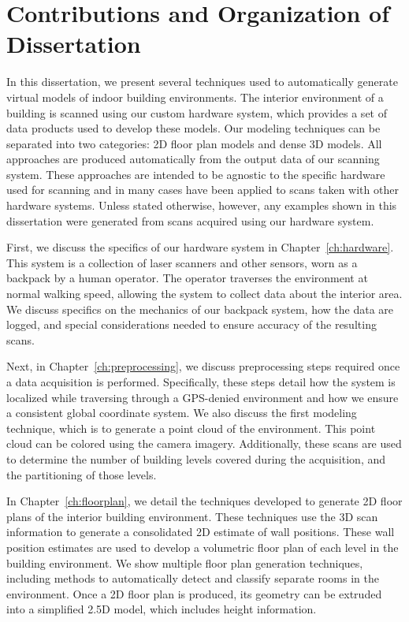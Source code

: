 \documentclass[12pt,onecolumn,oneside]{book}
\begin{document}
\section{Contributions and Organization of Dissertation}
\label{sec:organization}

In this dissertation, we present several techniques used to automatically generate virtual models of indoor building environments.  The interior environment of a building is scanned using our custom hardware system, which provides a set of data products used to develop these models.  Our modeling techniques can be separated into two categories:  2D floor plan models and dense 3D models.  All approaches are produced automatically from the output data of our scanning system.  These approaches are intended to be agnostic to the specific hardware used for scanning and in many cases have been applied to scans taken with other hardware systems.  Unless stated otherwise, however, any examples shown in this dissertation were generated from scans acquired using our hardware system.

First, we discuss the specifics of our hardware system in Chapter~\ref{ch:hardware}.  This system is a collection of laser scanners and other sensors, worn as a backpack by a human operator.  The operator traverses the environment at normal walking speed, allowing the system to collect data about the interior area.  We discuss specifics on the mechanics of our backpack system, how the data are logged, and special considerations needed to ensure accuracy of the resulting scans.

Next, in Chapter~\ref{ch:preprocessing}, we discuss preprocessing steps required once a data acquisition is performed.  Specifically, these steps detail how the system is localized while traversing through a GPS-denied environment and how we ensure a consistent global coordinate system.  We also discuss the first modeling technique, which is to generate a point cloud of the environment.  This point cloud can be colored using the camera imagery.  Additionally, these scans are used to determine the number of building levels covered during the acquisition, and the partitioning of those levels.

In Chapter~\ref{ch:floorplan}, we detail the techniques developed to generate 2D floor plans of the interior building environment.  These techniques use the 3D scan information to generate a consolidated 2D estimate of wall positions.  These wall position estimates are used to develop a volumetric floor plan of each level in the building environment.  We show multiple floor plan generation techniques, including methods to automatically detect and classify separate rooms in the environment.  Once a 2D floor plan is produced, its geometry can be extruded into a simplified 2.5D model, which includes height information.
\end{document}

